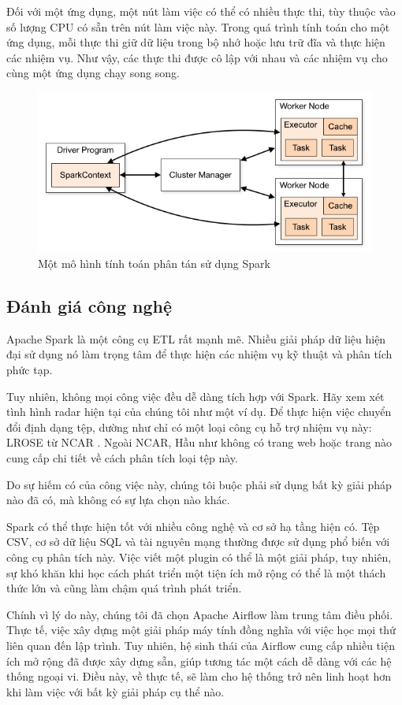 Đối với một ứng dụng, một nút làm việc có thể có nhiều thực thi, tùy thuộc vào số lượng CPU có sẵn trên nút làm việc này. Trong quá trình tính toán cho một ứng dụng, mỗi thực thi giữ dữ liệu trong bộ nhớ hoặc lưu trữ đĩa và thực hiện các nhiệm vụ. Như vậy, các thực thi được cô lập với nhau và các nhiệm vụ cho cùng một ứng dụng chạy song song.

\begin{figure}[H]
    \centering
    \includegraphics[width=0.7\linewidth]{Images/3.2-dist.png}
    \vspace{1em}
    \caption{Một mô hình tính toán phân tán sử dụng Spark}
    \label{fig:distributed}
\end{figure}

\subsection{Đánh giá công nghệ}
Apache Spark là một công cụ ETL rất mạnh mẽ. Nhiều giải pháp dữ liệu hiện đại sử dụng nó làm trọng tâm để thực hiện các nhiệm vụ kỹ thuật và phân tích phức tạp.

Tuy nhiên, không mọi công việc đều dễ dàng tích hợp với Spark. Hãy xem xét tình hình radar hiện tại của chúng tôi như một ví dụ. Để thực hiện việc chuyển đổi định dạng tệp, dường như chỉ có một loại công cụ hỗ trợ nhiệm vụ này: LROSE từ NCAR \cite{lrose}. Ngoài NCAR, Hầu như không có trang web hoặc trang nào cung cấp chi tiết về cách phân tích loại tệp này.

Do sự hiếm có của công việc này, chúng tôi buộc phải sử dụng bất kỳ giải pháp nào đã có, mà không có sự lựa chọn nào khác.

Spark có thể thực hiện tốt với nhiều công nghệ và cơ sở hạ tầng hiện có. Tệp CSV, cơ sở dữ liệu SQL và tài nguyên mạng thường được sử dụng phổ biến với công cụ phân tích này. Việc viết một plugin có thể là một giải pháp, tuy nhiên, sự khó khăn khi học cách phát triển một tiện ích mở rộng có thể là một thách thức lớn và cũng làm chậm quá trình phát triển.

Chính vì lý do này, chúng tôi đã chọn Apache Airflow làm trung tâm điều phối. Thực tế, việc xây dựng một giải pháp máy tính đồng nghĩa với việc học mọi thứ liên quan đến lập trình. Tuy nhiên, hệ sinh thái của Airflow cung cấp nhiều tiện ích mở rộng đã được xây dựng sẵn, giúp tương tác một cách dễ dàng với các hệ thống ngoại vi. Điều này, về thực tế, sẽ làm cho hệ thống trở nên linh hoạt hơn khi làm việc với bất kỳ giải pháp cụ thể nào.